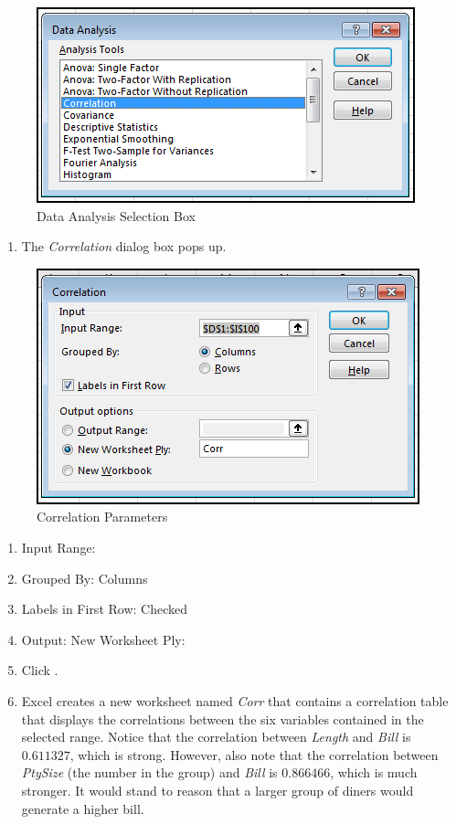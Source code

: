 \begin{figure}[H]
	\centering
	\includegraphics[width=\maxwidth{.95\linewidth}]{gfx/ch09_fig54}
	\caption{Data Analysis Selection Box}
	\label{09:fig54}
\end{figure}

\begin{enumerate}[resume]
	\item The \textit{Correlation} dialog box pops up.
\end{enumerate}

\begin{figure}[H]
	\centering
	\includegraphics[width=\maxwidth{.75\linewidth}]{gfx/ch09_fig55}
	\caption{Correlation Parameters}
	\label{09:fig55}
\end{figure}

\begin{enumerate}[resume]
	\item Input Range: 
	\item Grouped By: Columns
	\item Labels in First Row: Checked
	\item Output: New Worksheet Ply: 
	\item Click .
	\item Excel creates a new worksheet named \textit{Corr} that contains a correlation table that displays the correlations between the six variables contained in the selected range. Notice that the correlation between \textit{Length} and \textit{Bill} is $ 0.611327 $, which is strong. However, also note that the correlation between \textit{PtySize} (the number in the group) and \textit{Bill} is $ 0.866466 $, which is much stronger. It would stand to reason that a larger group of diners would generate a higher bill.
\end{enumerate}

